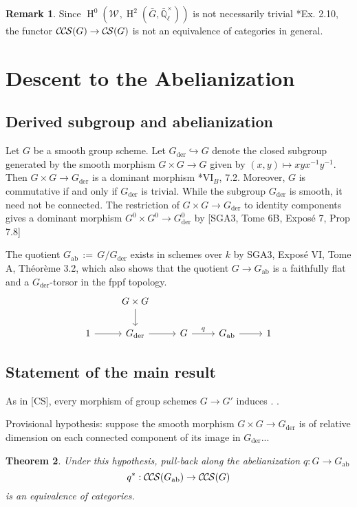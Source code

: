 \documentclass[10pt]{amsart}
\theoremstyle{plain}
\newtheorem{theorem}{Theorem}[section]
\theoremstyle{definition}
\newtheorem{remark}[theorem]{Remark}
\newcommand{\EE}{\mathbb{\bar Q}_\ell}
\newcommand{\Fq}{k}
\newcommand{\EEx}{\EE^\times}
\newcommand{\Weil}[1]{\mathcal{W}_{#1}}
\DeclareMathOperator{\Hh}{H}
\newcommand{\der}{_{\operatorname{der}}}
\newcommand{\ab}{_{\operatorname{ab}}}
\newcommand{\ceq}{{\, :=\, }}
\newcommand{\CS}{{\mathcal{C\hskip-0.8pt S}}}
\newcommand{\CCS}{{\mathcal{C\hskip-.8pt C\hskip-0.8pt S}}}
\newcommand{\bG}{\bar{G}}
\begin{document}
\begin{remark}
Since $\Hh^0(\Weil{},\Hh^2(\bG,\EEx))$ is not necessarily trivial \cite{cunningham-roe:13a}*{Ex. 2.10}, the functor
$\CCS(G) \to \CS(G)$ is not an equivalence of categories in general.
\end{remark}


\section{Descent to the Abelianization}

\subsection{Derived subgroup and abelianization}

Let $G$ be a smooth group scheme.
Let $G\der \hookrightarrow G$ denote the closed subgroup generated by the smooth morphism $G\times G \to G$ given by $(x,y)\mapsto xyx^{-1}y^{-1}$. Then $G \times G \to G\der$ is a dominant morphism \cite{SGA3}*{{VI}$_B$, 7.2}.
Moreover, $G$ is commutative if and only if $G\der$ is trivial.
%
While the subgroup $G\der$ is smooth, it need not be connected. 
The restriction of $G\times G\to G\der$ to identity components gives a dominant morphism $G^0\times G^0 \to G^0\der$ by [SGA3, Tome 6B, Expos\'e 7, Prop 7.8]


The quotient $G\ab\ceq G/G\der$ exists in schemes over $\Fq$ by SGA3, Expos\'e VI, Tome A, Th\'eor\`eme 3.2, which also shows that the quotient $G \to G\ab$ is a faithfully flat and a $G\der$-torsor in the fppf topology.
\[
\begin{tikzcd}
{} & G\times G \arrow{d}{} &&&\\
1 \arrow{r} & G\der \arrow{r}{} & G \arrow{r}{q} & G\ab \arrow{r} & 1
\end{tikzcd}
\]
 
 \subsection{Statement of the main result}


As in [CS], every morphism of group schemes $G \to G'$ induces . .  
 
Provisional hypothesis: suppose the smooth morphism $G\times G\to G\der$ is of relative dimension on each connected component of its image in $G\der$...

\begin{theorem}\label{thm:Gab}
Under this hypothesis, pull-back along the abelianization $q : G \to G\ab$
\[
q^* : \CCS(G\ab) \to \CCS(G)
\]
is an equivalence of categories.
\end{theorem}
\end{document}
